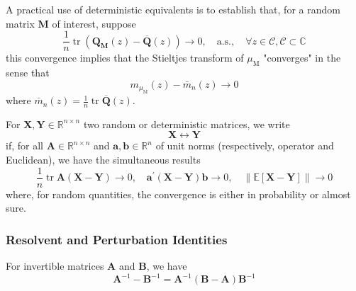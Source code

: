 \begin{remark}
    A practical use of deterministic equivalents is to establish that, for a random matrix $\mathbf{M}$ of interest, suppose
    \begin{equation*}
        \frac{1}{n}\operatorname{tr}\left(\mathbf{Q}_{\mathbf{M}}(z)-\overline{\mathbf{Q}}(z)\right)\rightarrow 0,\quad\text{a.s.},\quad\forall z\in\mathcal{C} ,\mathcal{C}\subset\mathbb{C}
    \end{equation*}
    this convergence implies that the Stieltjes transform of $\mu_{\mathrm{M}}$ "converges" in the sense that
    \begin{equation*}
        m_{\mu_{\mathrm{M}}}(z)-\bar{m}_{n}(z)\rightarrow 0
    \end{equation*}
    where $\bar{m}_{n}(z)=\frac{1}{n}\operatorname{tr}\overline{\mathbf{Q}}(z)$.
\end{remark}

\begin{definition}
    For $\mathbf{X},\mathbf{Y}\in\mathbb{R}^{n \times n}$ two random or deterministic matrices, we write
    \begin{equation}
        \mathbf{X}\leftrightarrow\mathbf{Y}
    \end{equation}
    if, for all $\mathbf{A}\in\mathbb{R}^{n\times n}$ and $\mathbf{a},\mathbf{b}\in\mathbb{R}^{n}$ of unit norms (respectively, operator and Euclidean), we have the simultaneous results
    \begin{equation*}
        \frac{1}{n}\operatorname{tr}\mathbf{A}(\mathbf{X}-\mathbf{Y})\rightarrow 0,\quad \mathbf{a}^{\prime}(\mathbf{X}-\mathbf{Y})\mathbf{b}\rightarrow 0,\quad\|\mathbb{E}[\mathbf{X}-\mathbf{Y}]\|\rightarrow 0
    \end{equation*}
    where, for random quantities, the convergence is either in probability or almost sure.
\end{definition}

\subsubsection{Resolvent and Perturbation Identities}

\begin{lemma} \label{lem:resolvent-identity}
    For invertible matrices $\mathbf{A}$ and $\mathbf{B}$, we have
    \begin{equation}
        \mathbf{A}^{-1}-\mathbf{B}^{-1}=\mathbf{A}^{-1}\left(\mathbf{B}-\mathbf{A}\right)\mathbf{B}^{-1}
    \end{equation}
\end{lemma}

